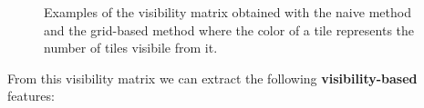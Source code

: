 \documentclass{Configuration_Files/PoliMi3i_thesis}
\begin{document}
\begin{figure}[H]
    \centering
    \qquad
    \caption[Visibility comparison]{Examples of the visibility matrix obtained with the naive method and the grid-based method where the color of a tile represents the number of tiles visibile from it.}
    \label{fig:visibility_example}
\end{figure}

From this visibility matrix we can extract the following \textbf{visibility-based} features:
\end{document}

